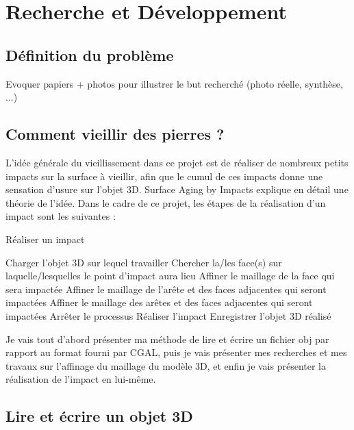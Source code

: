 \documentclass[a4paper,french]{report}
\begin{document}
	\chapter{Recherche et Développement}
		\section{Définition du problème}
			
		Evoquer papiers + photos pour illustrer le but recherché (photo réelle, synthèse, ...)
		\section{Comment vieillir des pierres ?}
			L'idée générale du vieillissement dans ce projet est de réaliser de nombreux petits impacts sur la surface à vieillir, afin que le cumul de ces impacts donne une sensation d'usure sur l'objet 3D. Surface Aging by Impacts \cite{PPD01} explique en détail une théorie de l'idée. Dans le cadre de ce projet, les étapes de la réalisation d'un impact sont les suivantes : 
			\begin{algorithm}[H]
				\caption{Réaliser un impact}
				\begin{algorithmic}[1]
					\STATE Charger l'objet 3D sur lequel travailler
					\REPEAT
						\REPEAT
							\STATE Chercher la/les face(s) sur laquelle/lesquelles le point d'impact aura lieu
								\STATE Affiner le maillage de la face qui sera impactée
								\STATE Affiner le maillage de l'arête et des faces adjacentes qui seront impactées
								\STATE Affiner le maillage des arêtes et des faces adjacentes qui seront impactées
							\ELSE
								\STATE Arrêter le processus
							\ENDIF
						\STATE Réaliser l'impact
					\STATE Enregistrer l'objet 3D réalisé
				\end{algorithmic}
			\end{algorithm}
			
		Je vais tout d'abord présenter ma méthode de lire et écrire un fichier obj par rapport au format fourni par CGAL, puis je vais présenter mes recherches et mes travaux sur l'affinage du maillage du modèle 3D, et enfin je vais présenter la réalisation de l'impact en lui-même.
		\section{Lire et écrire un objet 3D}
\end{document}
